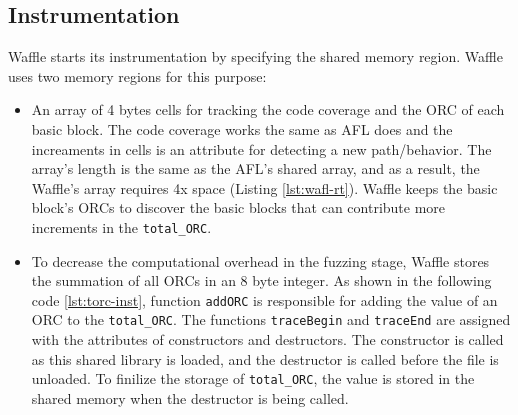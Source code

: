 

\subsection{Instrumentation}
\label{subsec:inst}


Waffle starts its instrumentation by specifying the shared memory region. Waffle uses two memory regions for this purpose:

\begin{itemize}
  \item An array of 4 bytes cells for tracking the code coverage and the ORC of each basic block. The code coverage works the same as AFL does and the increaments in cells is an attribute for detecting a new path/behavior. The array's length is the same as the AFL's shared array, and as a result, the Waffle's array requires 4x space (Listing \ref{lst:wafl-rt}). Waffle keeps the basic block's ORCs to discover the basic blocks that can contribute more increments in the \texttt{total\_ORC}.
  
  

  \item To decrease the computational overhead in the fuzzing stage, Waffle stores the summation of all ORCs in an 8 byte integer. As shown in the following code \ref{lst:torc-inst}, function \texttt{addORC} is responsible for adding the value of an ORC to the \texttt{total\_ORC}. The functions \texttt{traceBegin} and \texttt{traceEnd} are assigned with the attributes of constructors and destructors. The constructor is called as this shared library is loaded, and the destructor is called before the file is unloaded. To finilize the storage of \texttt{total\_ORC}, the value is stored in the shared memory when the destructor is being called. 
  
  
\end{itemize}

